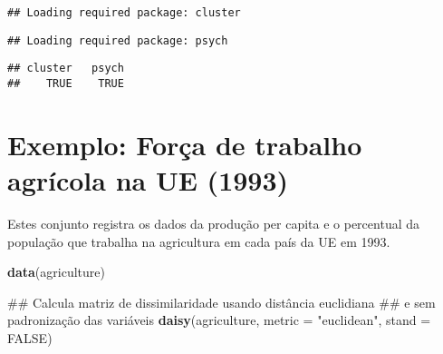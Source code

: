 \documentclass[]{book}
\newenvironment{Shaded}{\begin{snugshade}}{\end{snugshade}}
\newcommand{\KeywordTok}[1]{\textcolor[rgb]{0.13,0.29,0.53}{\textbf{{#1}}}}
\newcommand{\DataTypeTok}[1]{\textcolor[rgb]{0.13,0.29,0.53}{{#1}}}
\newcommand{\StringTok}[1]{\textcolor[rgb]{0.31,0.60,0.02}{{#1}}}
\newcommand{\OtherTok}[1]{\textcolor[rgb]{0.56,0.35,0.01}{{#1}}}
\newcommand{\NormalTok}[1]{{#1}}
\begin{document}
\begin{verbatim}
## Loading required package: cluster
\end{verbatim}

\begin{verbatim}
## Loading required package: psych
\end{verbatim}

\begin{verbatim}
## cluster   psych 
##    TRUE    TRUE
\end{verbatim}

\section{Exemplo: Força de trabalho agrícola na UE
(1993)}\label{exemplo-forca-de-trabalho-agricola-na-ue-1993}

Estes conjunto registra os dados da produção per capita e o percentual
da população que trabalha na agricultura em cada país da UE em 1993.

\begin{Shaded}
\begin{Highlighting}[]
\KeywordTok{data}\NormalTok{(agriculture)}

\NormalTok{## Calcula matriz de dissimilaridade usando distância euclidiana }
\NormalTok{## e sem padronização das variáveis}
\KeywordTok{daisy}\NormalTok{(agriculture, }\DataTypeTok{metric =} \StringTok{"euclidean"}\NormalTok{, }\DataTypeTok{stand =} \OtherTok{FALSE}\NormalTok{)}
\end{Highlighting}
\end{Shaded}
\end{document}
